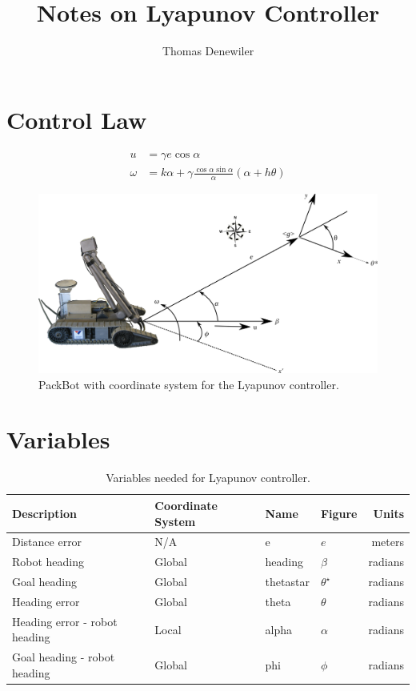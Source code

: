 \documentclass[12pt]{article}
\begin{document}
\title{Notes on Lyapunov Controller}
\author{Thomas Denewiler}
\maketitle

\section{Control Law}
\begin{align*}
u &= \gamma e\cos\alpha \\
\omega &= k\alpha + \gamma\frac{\cos\alpha\sin\alpha}{\alpha}\left(\alpha+h\theta\right)
\end{align*}

\begin{figure}[ht!]
	\centering
	\includegraphics[width=.95\textwidth]{images/packbotlyapunov}
	\caption{PackBot with coordinate system for the Lyapunov controller.}
	\label{fig:pblyapunov}
\end{figure}

\section{Variables}
\begin{table}[ht!]
\caption{Variables needed for Lyapunov controller.}
\small
\centering
\begin{tabular}{@{}llllr@{}} \toprule
Description                   & Coordinate System & Name      & Figure         & Units \\ \midrule
Distance error                & N/A               & e         & $e$            & meters \\
Robot heading                 & Global            & heading   & $\beta$        & radians \\
Goal heading                  & Global            & thetastar & $\theta^\star$ & radians \\
Heading error                 & Global            & theta     & $\theta$       & radians \\
Heading error - robot heading & Local             & alpha     & $\alpha$       & radians \\
Goal heading - robot heading  & Global            & phi       & $\phi$         & radians \\ \bottomrule
\end{tabular}
\label{tab:LyapunovVariables}
\end{table}
\end{document}
